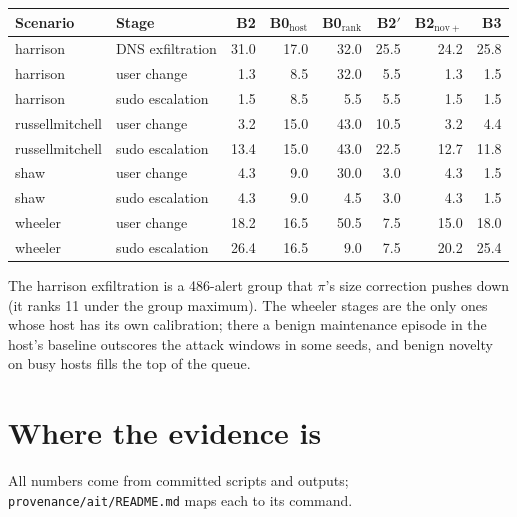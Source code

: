 \documentclass[10.5pt,a4paper]{article}
\begin{document}
\begin{center}\small\setlength{\tabcolsep}{4.5pt}
\begin{tabular}{@{}l l r r r r r r@{}}
\toprule
Scenario & Stage & B2 & B0$_\mathrm{host}$ & B0$_\mathrm{rank}$ & B2$'$ & B2$_\mathrm{nov+}$ & B3 \\
\midrule
harrison & DNS exfiltration & 31.0 & 17.0 & 32.0 & 25.5 & 24.2 & 25.8 \\
harrison & user change & 1.3 & 8.5 & 32.0 & 5.5 & 1.3 & 1.5 \\
harrison & sudo escalation & 1.5 & 8.5 & 5.5 & 5.5 & 1.5 & 1.5 \\
russellmitchell & user change & 3.2 & 15.0 & 43.0 & 10.5 & 3.2 & 4.4 \\
russellmitchell & sudo escalation & 13.4 & 15.0 & 43.0 & 22.5 & 12.7 & 11.8 \\
shaw & user change & 4.3 & 9.0 & 30.0 & 3.0 & 4.3 & 1.5 \\
shaw & sudo escalation & 4.3 & 9.0 & 4.5 & 3.0 & 4.3 & 1.5 \\
wheeler & user change & 18.2 & 16.5 & 50.5 & 7.5 & 15.0 & 18.0 \\
wheeler & sudo escalation & 26.4 & 16.5 & 9.0 & 7.5 & 20.2 & 25.4 \\
\bottomrule
\end{tabular}
\end{center}

\noindent The harrison exfiltration is a 486-alert group that $\pi$'s size correction pushes down (it ranks 11 under the group maximum). The wheeler stages are the only ones whose host has its own calibration; there a benign maintenance episode in the host's baseline outscores the attack windows in some seeds, and benign novelty on busy hosts fills the top of the queue.

\section{Where the evidence is}

All numbers come from committed scripts and outputs; \texttt{provenance/ait/README.md} maps each to its command.
\end{document}
